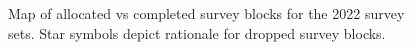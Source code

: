 \documentclass[12pt]{article}\usepackage[]{graphicx}\usepackage[]{color}
\begin{document}
\begin{figure}[htb]

{\centering {} 

}

\caption{Map of allocated vs completed survey blocks for the 2022 survey sets. Star symbols depict rationale for dropped survey blocks.}\label{fig:figure5}
\end{figure}
\clearpage
\end{document}
